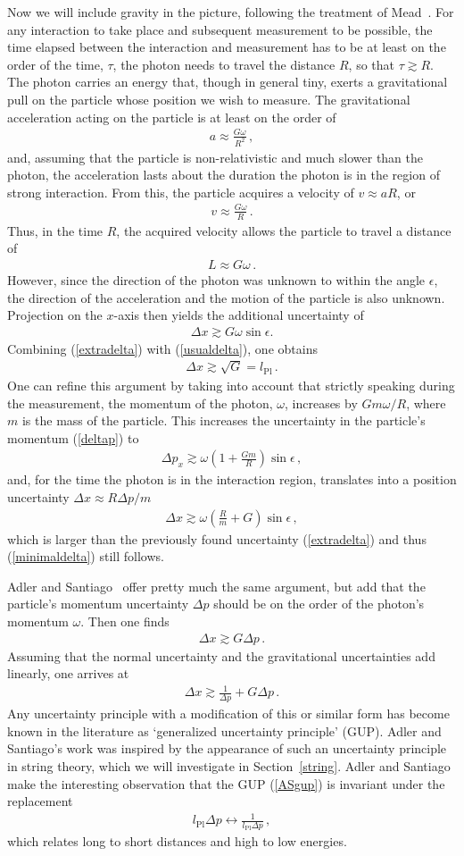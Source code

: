 \documentclass{article}
\def\beqn{\begin{eqnarray}}
\def\eeqn{\end{eqnarray}}
\begin{document}
Now we will include gravity in the picture, following the treatment of Mead~\cite{Mead}. 
For any interaction to take place and subsequent measurement to be possible, the time
elapsed between the interaction and measurement has to be at least on the order of the
time, $\tau$, the photon needs to travel the distance $R$, so that $\tau \gtrsim R$.
The photon carries an energy that, though in general tiny, exerts a gravitational pull on
the particle whose position we wish to measure. The gravitational acceleration 
acting on the particle is
at least on the order of
\beqn
a \approx \frac{G \omega}{R^2} \,,
\eeqn
and, assuming that the particle is non-relativistic and much slower than the photon, 
the acceleration lasts about the duration the photon is in the region of strong interaction. From this,
the particle acquires a velocity of $v \approx a R$, or
\beqn
v \approx \frac{G \omega}{R} \,.
\eeqn
Thus, in the time $R$, the acquired velocity allows the particle to travel a distance of
\beqn
L \approx G \omega \,.
\eeqn
However, since the direction of the photon was unknown to within the angle $\epsilon$, the direction of the acceleration
and the motion of the particle is also unknown. Projection on the $x$-axis then yields the additional 
uncertainty of
\beqn
\Delta x \gtrsim G \omega \sin \epsilon. \label{extradelta}
\eeqn 
Combining (\ref{extradelta}) with (\ref{usualdelta}), one obtains
\beqn
\Delta x \gtrsim \sqrt{G} = l_{\mathrm{Pl}} \,. \label{minimaldelta}
\eeqn
One can refine this argument by taking into account that strictly speaking during the measurement, the
momentum of the photon, $\omega$, increases by $G m \omega / R$, where $m$ is the mass of the
particle. This increases the uncertainty in the particle's momentum (\ref{deltap}) to
\beqn
\Delta p_x \gtrsim \omega \left( 1 + \frac{Gm}{R} \right) \sin \epsilon \,,
\eeqn
and, for the time the photon is in the interaction region, translates into a position uncertainty $\Delta x \approx R \Delta p /m$
\beqn
\Delta x \gtrsim  \omega \left( \frac{R}{m} + G \right) \sin \epsilon \,,
\eeqn
which is larger than the previously found uncertainty (\ref{extradelta}) and thus (\ref{minimaldelta}) still follows. 

Adler and Santiago~\cite{Adler} offer pretty much the same argument, but add that
the particle's momentum uncertainty $\Delta p$ should be on the order of the photon's momentum $\omega$. Then one finds
\beqn 
\Delta x \gtrsim G \Delta p \,.
\eeqn
Assuming that the normal uncertainty and the gravitational uncertainties add linearly, one arrives at
\beqn
\Delta x \gtrsim \frac{1}{\Delta p} + G \Delta p \,. \label{ASgup}
\eeqn
Any uncertainty principle with a modification of this or similar form has become known in the literature as
`generalized uncertainty principle' ({\sc GUP}).  Adler and Santiago's
work was inspired by the appearance of such an uncertainty principle in string theory, which we will investigate in
Section~\ref{string}. Adler and Santiago make the interesting observation that the {\sc GUP} (\ref{ASgup}) is invariant under the replacement
\beqn
l_{\mathrm{Pl}}  \Delta p \leftrightarrow \frac{1}{l_{\mathrm{Pl}}  \Delta p} \,,
\eeqn
which relates long to short distances and high to low energies. 
\end{document}
